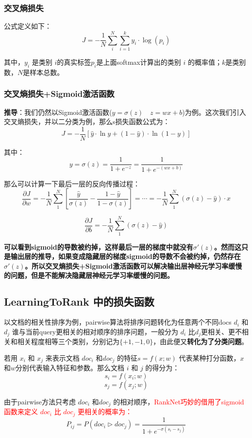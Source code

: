 \documentclass[12pt]{article}
\begin{document}
\subsubsection{交叉熵损失}
公式定义如下：
$$
J = -\frac{1}{N}\sum_i^N\sum_{i=1}^ky_i\cdot\log{(p_i)}
$$

其中，$y_i$ 是类别 $i$的真实标签$p_i$是上面softmax计算出的类别 $i$ 的概率值；$k$是类别数，$N$是样本总数。

\subsubsection{交叉熵损失+Sigmoid激活函数}
\textbf{推导}：我们仍然以Sigmoid激活函数($y = \sigma(z) \quad z = wx + b$)为例。这次我们引入交叉熵损失，并以二分类为例，那么s损失函数公式为：
$$
J = -\frac{1}{N}[\hat{y}\cdot\ln{y} + (1-\hat{y})\cdot\ln{(1-y)}]
$$

其中：
$$
y = \sigma(z) = \frac{1}{1+e^{-z}} = \frac{1}{1+e^{-(wx+b)}}
$$

那么可以计算一下最后一层的反向传播过程：
$$
\frac{\partial J}{\partial w} = -\frac{1}{N}\sum_1^N[\frac{\hat{y}}{\sigma(z)} - \frac{1-\hat{y}}{1-\sigma(z)}] = \cdots =  -\frac{1}{N}\sum_1^N(\sigma(z)-\hat{y})\cdot x
$$

$$
\frac{\partial J}{\partial b} = -\frac{1}{N}\sum_1^N(\sigma(z)-\hat{y})
$$

\textbf{可以看到sigmoid的导数被约掉，这样最后一层的梯度中就没有$\sigma'(z)$。然而这只是输出层的推导，如果变成隐藏层的梯度sigmoid的导数不会被约掉，仍然存在$\sigma'(z)$。所以交叉熵损失+Sigmoid激活函数可以解决输出层神经元学习率缓慢的问题，但是不能解决隐藏层神经元学习率缓慢的问题。}

\subsection{LearningToRank 中的损失函数\cite{About_RankNet_LambdaRank}}
以文档的相关性排序为例，pairwise算法将排序问题转化为任意两个不同docs $d_i$ 和 $d_j$ 谁与当前query更相关的相对顺序的排序问题，一般分为 $d_i$ 比$d_j$更相关、更不相关和相关程度相等三个类别，分别记为$\{+1, -1, 0\}$，由此便又\textbf{转化为了分类问题}。

若用 $x_i$ 和 $x_j$ 来表示文档 $doc_i$ 和$doc_j$ 的特征$s = f(x;w)$ 代表某种打分函数，$x$和$w$分别代表输入特征和参数。那么文档 $i$ 和 $j$ 的得分为：
$$
s_i = f(x_i;w)
$$
$$
s_j = f(x_j;w)
$$

由于pairwise方法只考虑 $doc_i$ 和$doc_j$ 的相对顺序，\textcolor{red}{RankNet巧妙的借用了sigmoid函数来定义 $doc_i$ 比 $doc_j$ 更相关的概率为：}
$$
P_{ij} = P(doc_i \rhd doc_j) = \frac{1}{1 + e^{-\sigma(s_i - s_j)}}
$$
\end{document}
